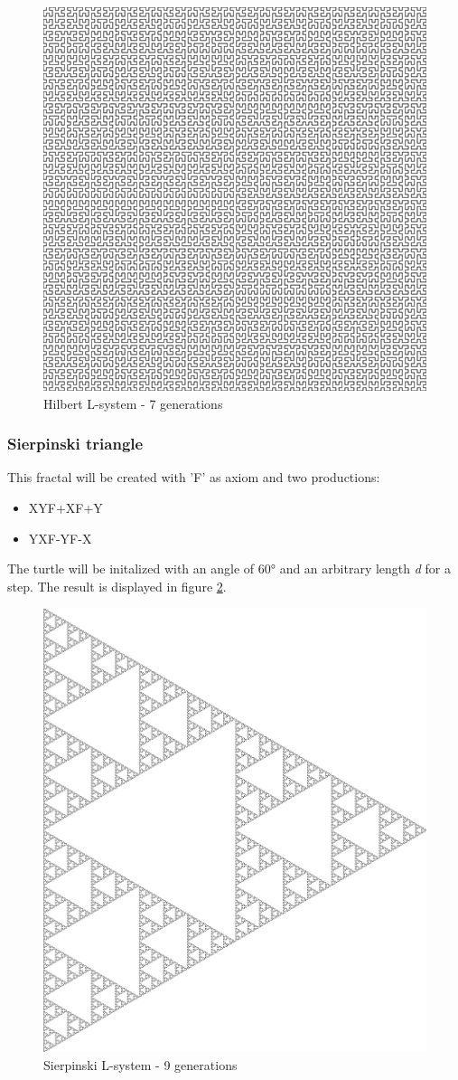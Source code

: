 \documentclass[english]{cpp-hmwk}
\begin{document}
\begin{figure}[h!]
	\centering
	\includegraphics[width=0.6\columnwidth]{../graphs/Examples/hilbert.png}
	\caption{Hilbert L-system - 7 generations}
	\label{figure:Hilbert}
\end{figure}
 

\subsubsection{Sierpinski triangle}
This fractal will be created with 'F' as axiom and two productions:

\begin{itemize}
\item X\rightarrow YF+XF+Y
\item Y\rightarrow XF-YF-X
\end{itemize}

\noindent The turtle will be initalized with an angle of 60° and an arbitrary length \textit{d} for a step. The result is displayed in figure \ref{figure:Sierpinski}.
 
\begin{figure}[h!]
	\centering
	\includegraphics[width=0.6\columnwidth]{../graphs/Examples/sierpinski.png}
	\caption{Sierpinski L-system - 9 generations}
	\label{figure:Sierpinski}
\end{figure}
 
\end{document}

